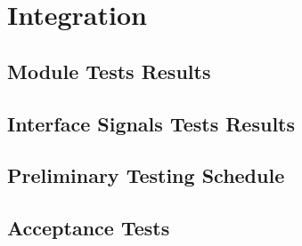 \chapter{Integration}
\section{Module Tests Results}
\section{Interface Signals Tests Results}
\section{Preliminary Testing Schedule}
\section{Acceptance Tests}
